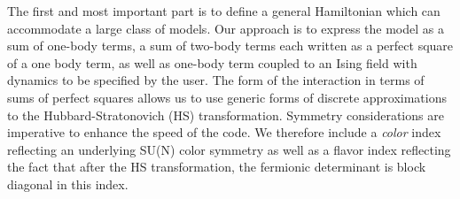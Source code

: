 The first and most important  part is to define a general Hamiltonian which  can  accommodate a large class of models. 
Our approach is to express the model as a sum of one-body terms, a sum of two-body terms each written as a perfect square of a one body term, as well as one-body  term  coupled to an Ising field with  dynamics to be specified by the user. 
The form of the interaction in terms of sums of perfect squares allows us to use generic forms of  discrete  approximations to the  Hubbard-Stratonovich (HS)  transformation. 
Symmetry considerations  are  imperative to enhance the speed of the code.  
We therefore include a \textit{color} index  reflecting  an underlying  SU(N) color symmetry as  well as a flavor index  reflecting  the fact that  after  the HS  transformation,  the  fermionic determinant is block diagonal in this index.

